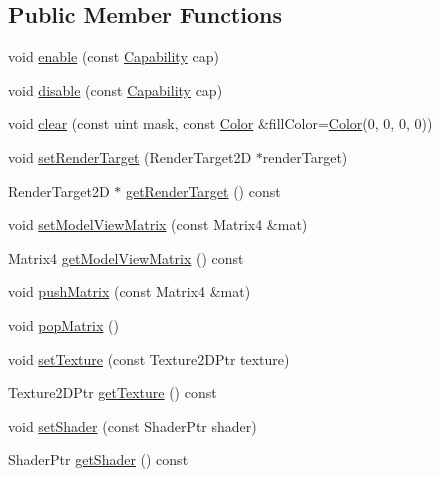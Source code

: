 \subsection*{Public Member Functions}
\begin{DoxyCompactItemize}
\item 
void \hyperlink{class_graphics_context_ab530828f0209ce95ff7f2c00297fbe76}{enable} (const \hyperlink{class_graphics_context_a4171335401279aad7e5a463349c093c6}{Capability} cap)
\item 
void \hyperlink{class_graphics_context_a282d800096bcd6c9a02115bf4b33fbe9}{disable} (const \hyperlink{class_graphics_context_a4171335401279aad7e5a463349c093c6}{Capability} cap)
\item 
void \hyperlink{class_graphics_context_a2042f7857d65640d4251161d6c6ba34a}{clear} (const uint mask, const \hyperlink{struct_color}{Color} \&fill\+Color=\hyperlink{struct_color}{Color}(0, 0, 0, 0))
\item 
void \hyperlink{class_graphics_context_a4ecf8a82b0a8824005fd79ec37b2602e}{set\+Render\+Target} (Render\+Target2\+D $\ast$render\+Target)
\item 
Render\+Target2\+D $\ast$ \hyperlink{class_graphics_context_ab630203811c66d63ac6ceb511ced90f2}{get\+Render\+Target} () const 
\item 
void \hyperlink{class_graphics_context_a395d4f9a734509da73c1757929a0f7f7}{set\+Model\+View\+Matrix} (const Matrix4 \&mat)
\item 
Matrix4 \hyperlink{class_graphics_context_a50388419b98eadbf2d38e787aaa7fae7}{get\+Model\+View\+Matrix} () const 
\item 
void \hyperlink{class_graphics_context_a0784775a27375168d2867bd47363e899}{push\+Matrix} (const Matrix4 \&mat)
\item 
void \hyperlink{class_graphics_context_a89162c73545bb184c781c825dd72f082}{pop\+Matrix} ()
\item 
void \hyperlink{class_graphics_context_af49e7858667f3ed99956517a33c298df}{set\+Texture} (const Texture2\+D\+Ptr texture)
\item 
Texture2\+D\+Ptr \hyperlink{class_graphics_context_ab7ab5aa673a41e08f1ba325682c04c74}{get\+Texture} () const 
\item 
void \hyperlink{class_graphics_context_aa547cd0c7d532d7c6e6946af0d988429}{set\+Shader} (const Shader\+Ptr shader)
\item 
Shader\+Ptr \hyperlink{class_graphics_context_af0eeabbc9586e2939fef72bed1b0969e}{get\+Shader} () const 
\item 

\end{DoxyCompactItemize}

